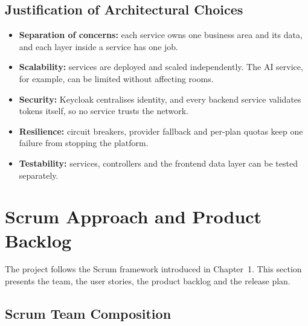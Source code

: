 \documentclass[12pt,a4paper]{report}
\begin{document}
\subsection{Justification of Architectural Choices}
\label{subsec:arch-justif}

\begin{itemize}
  \item \textbf{Separation of concerns:} each service owns one business area and its data, and each layer inside a service has one job.
  \item \textbf{Scalability:} services are deployed and scaled independently. The AI service, for example, can be limited without affecting rooms.
  \item \textbf{Security:} Keycloak centralises identity, and every backend service validates tokens itself, so no service trusts the network.
  \item \textbf{Resilience:} circuit breakers, provider fallback and per-plan quotas keep one failure from stopping the platform.
  \item \textbf{Testability:} services, controllers and the frontend data layer can be tested separately.
\end{itemize}


%
%

\section{Scrum Approach and Product Backlog}
\label{sec:scrum}

The project follows the Scrum framework introduced in Chapter~1. This section presents the team, the user stories, the product backlog and the release plan.

\subsection{Scrum Team Composition}
\label{subsec:scrum-team}
\end{document}
